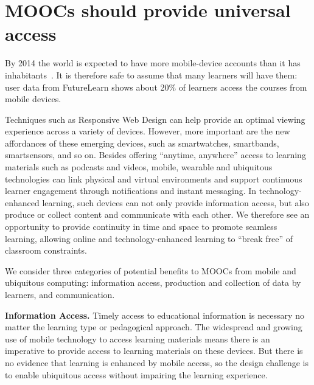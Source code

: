 \section{MOOCs should provide universal access}



By 2014 the world is expected to have more mobile-device accounts than
it has inhabitants~\cite{siliconindia-mobile-device-growth}.
It is therefore safe to assume that many learners will have them: user
data from FutureLearn shows about 20\% of 
learners access the courses from mobile devices. 

Techniques such as Responsive Web Design can help provide an optimal
viewing experience across a variety of devices.
However, more important are the new affordances of these emerging
devices, such as  smartwatches, smartbands,
smartsensors, and so on.
Besides offering ``anytime, anywhere'' access to learning materials such
as podcasts and videos, mobile, wearable and ubiquitous technologies can
link  physical and virtual environments and 
support continuous learner engagement through
notifications and instant messaging. In technology-enhanced learning,
such devices can not only provide information access, but
also produce or collect content and communicate with each other.
We therefore see an opportunity to provide continuity in time and
space to promote seamless learning, allowing online and
technology-enhanced learning to ``break free'' of classroom constraints.

We consider three categories of potential benefits to MOOCs from mobile
and ubiquitous 
computing: information access, production and
collection of data by learners, and communication.

\textbf{Information Access.}  Timely access to educational information is 
necessary no matter the learning type or
pedagogical approach. The widespread and growing use of mobile
technology to access learning materials means there is an imperative to
provide access to learning materials on these devices. But there is no
evidence that learning is enhanced by mobile
access, so the design challenge is to enable ubiquitous access without
impairing the learning experience.  

